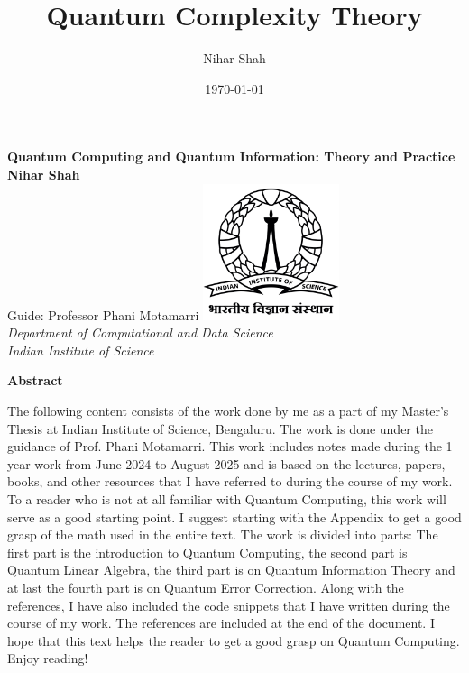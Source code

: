 \documentclass[12pt, oneside]{book}
\theoremstyle{definition}
\theoremstyle{definition}
\theoremstyle{remark}
\newcommand{\abstractname}{Abstract}
\newenvironment{abstract}{%
\clearpage
\null\vfill
\begin{center}%
    \bfseries \abstractname
\end{center}}%
{\vfill\null}
\begin{document}
\frontmatter

\title{\vspace{-3.0cm}Quantum Complexity Theory}  %
\author{Nihar Shah}  %
\date{\today}  %
\maketitle  %

\begin{center}
\vspace*{2cm}
\textbf{Quantum Computing and Quantum Information: Theory and Practice}\\[1cm]
\textbf{Nihar Shah}\\[1cm]
Guide: Professor Phani Motamarri
\vfill
\includegraphics[width=0.3\textwidth]{Images/IISc_Master_Seal_Black.jpg}\\[1cm]
\large \textit{Department of Computational and Data Science}\\
\large \textit{Indian Institute of Science}
\vfill
\end{center}

\frontmatter

\begin{abstract}
The following content consists of the work done by me as a part of my Master's Thesis at Indian
Institute of Science, Bengaluru. The work is done under the guidance of Prof. Phani Motamarri. 
This work includes notes made during the 1 year work from June 2024 to August 2025 and is based on the
lectures, papers, books, and other resources that I have referred to during the course of my work.
To a reader who is not at all familiar with Quantum Computing, this work will serve as a good starting point. 
I suggest starting with the Appendix to get a good grasp of the math used in the entire text. 
The work is divided into parts: The first part is the introduction to Quantum Computing, the second part is Quantum Linear Algebra, the third part is on Quantum Information Theory and at last the fourth part is on Quantum Error Correction. Along with the references, 
I have also included the code snippets that I have written during the course of my work. The references are included at the end of the document.
I hope that this text helps the reader to get a good grasp on Quantum Computing. Enjoy reading!
\end{abstract}
\end{document}
